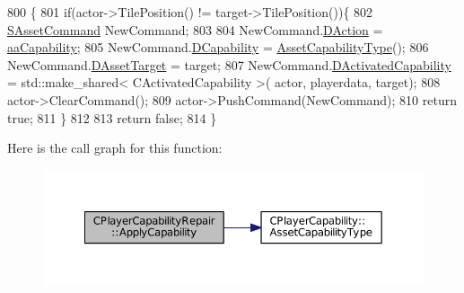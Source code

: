 \begin{DoxyCode}
800                                                                                                            
                                                          \{
801     \textcolor{keywordflow}{if}(actor->TilePosition() != target->TilePosition())\{
802         \hyperlink{structSAssetCommand}{SAssetCommand} NewCommand;
803         
804         NewCommand.\hyperlink{structSAssetCommand_a8edd3b3d59a76d5514ba403bc8076a75}{DAction} = \hyperlink{GameDataTypes_8h_ab47668e651a3032cfb9c40ea2d60d670acf9fb164e8abd71c71f4a8c7fda360d4}{aaCapability};
805         NewCommand.\hyperlink{structSAssetCommand_a734ea7c6847457b437360f333f570ff9}{DCapability} = \hyperlink{classCPlayerCapability_a433bb196cd6ab6a932f1cac102b3aa98}{AssetCapabilityType}();
806         NewCommand.\hyperlink{structSAssetCommand_a3d9b43f6e59c386c48c41a65448a0c39}{DAssetTarget} = target;
807         NewCommand.\hyperlink{structSAssetCommand_ad8beda19520811cc70fe1eab16c774dd}{DActivatedCapability} = std::make\_shared< CActivatedCapability >(
      actor, playerdata, target);
808         actor->ClearCommand();
809         actor->PushCommand(NewCommand);
810         \textcolor{keywordflow}{return} \textcolor{keyword}{true};
811     \}
812 
813     \textcolor{keywordflow}{return} \textcolor{keyword}{false};
814 \}
\end{DoxyCode}
Here is the call graph for this function\+:\nopagebreak
\begin{figure}[H]
\begin{center}
\leavevmode
\includegraphics[width=350pt]{classCPlayerCapabilityRepair_ab4e8da6f225b4bfb7023d75749454ff1_cgraph}
\end{center}
\end{figure}
\hypertarget{classCPlayerCapabilityRepair_ae989c67c5e14bbba5b2ddda993ee635a}{}\label{classCPlayerCapabilityRepair_ae989c67c5e14bbba5b2ddda993ee635a} 
